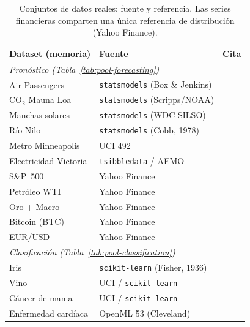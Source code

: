 \begin{table}[H]
\centering
\caption{Conjuntos de datos reales: fuente y referencia. Las series financieras
 comparten una única referencia de distribución (Yahoo Finance).}
\label{tab:datasets-reales}
\small
\setlength{\tabcolsep}{5pt}
\begin{tabular}{lll}
\toprule
\textbf{Dataset (memoria)} & \textbf{Fuente} & \textbf{Cita} \\
\midrule
\multicolumn{3}{l}{\textit{Pronóstico (Tabla~\ref{tab:pool-forecasting})}} \\[2pt]
Air Passengers        & \texttt{statsmodels} (Box \& Jenkins)      & \cite{ds_airpassengers} \\
CO$_2$ Mauna Loa      & \texttt{statsmodels} (Scripps/NOAA)        & \cite{ds_co2} \\
Manchas solares       & \texttt{statsmodels} (WDC-SILSO)           & \cite{ds_sunspots} \\
Río Nilo              & \texttt{statsmodels} (Cobb, 1978)          & \cite{ds_nile} \\
Metro Minneapolis     & UCI 492                                    & \cite{ds_metro} \\
Electricidad Victoria & \texttt{tsibbledata} / AEMO                & \cite{ds_vicelec} \\
S\&P~500              & Yahoo Finance                              & \cite{ds_yahoo} \\
Petróleo WTI          & Yahoo Finance                              & \cite{ds_yahoo} \\
Oro + Macro           & Yahoo Finance                              & \cite{ds_yahoo} \\
Bitcoin (BTC)         & Yahoo Finance                              & \cite{ds_yahoo} \\
EUR/USD               & Yahoo Finance                              & \cite{ds_yahoo} \\
\midrule
\multicolumn{3}{l}{\textit{Clasificación (Tabla~\ref{tab:pool-classification})}} \\[2pt]
Iris                  & \texttt{scikit-learn} (Fisher, 1936)       & \cite{ds_iris} \\
Vino                  & UCI / \texttt{scikit-learn}                & \cite{ds_wine} \\
Cáncer de mama        & UCI / \texttt{scikit-learn}                & \cite{ds_breastcancer} \\
Enfermedad cardíaca   & OpenML 53 (Cleveland)                      & \cite{ds_heart} \\

\end{tabular}
\end{table}
